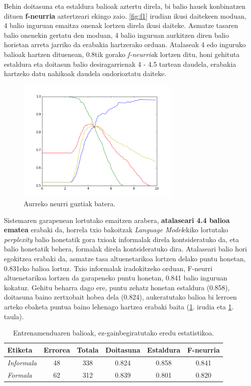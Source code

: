 \documentclass[information,article,submit,moreauthors,pdftex,10pt,a4paper]{Definitions/mdpi}
\begin{document}
Behin doitasuna eta estaldura balioak aztertu direla, bi balio hauek konbinatzen dituen \textbf{f-neurria} aztertzeari ekingo zaio. \ref{fig:f1} irudian ikusi daitekeen moduan, 4 balio inguruan emaitza onenak lortzen direla ikusi daiteke. Asmatze tasaren balio onenekin gertatu den moduan, 4 balio inguruan aurkitzen diren balio horietan arreta jarriko da erabakia hartzerako orduan. Atalaseak 4 edo inguruko balioak hartzen dituenean, 0.8tik gorako \textit{f-neurria}k lortzen ditu, honi gehituta estaldura eta doitasun balio desiragarrienak 4 - 4.5 tartean daudela, erabakia hartzeko datu nahikoak daudela ondorioztatu daiteke.

\begin{figure}[H]
  \centering
  \includegraphics[height=6cm]{denaperp}
  \caption{Aurreko neurri guztiak batera.}
  \label{fig:all m}
\end{figure}

\indent Sistemaren garapenean lortutako emaitzen arabera, \textbf{atalaseari 4.4 balioa ematea} erabaki da, horrela txio bakoitzak \textit{Language Model}ekiko lortutako \textit{perplexity} balio honetatik gora txioak informalak direla kontsideratuko da, eta balio honetatik behera, formalak direla kontsideratuko dira. Atalaseari balio hori egokitzea erabaki da, asmatze tasa altuenetarikoa lortzen delako puntu honetan, 0.831eko balioa lortuz. Txio informalak iradokitzeko orduan, F-neurri altuenetarikoa lortzen da garapeneko puntu honetan, 0.841 balio inguruan kokatuz. Gehitu beharra dago ere, puntu zehatz honetan estaldura (0.858), doitasuna baino zertxobait hobea dela (0.824), aukeratutako balioa bi lerroen arteko ebaketa puntua baino lehenago hartzea erabaki baita (\ref{fig:all m}. irudia eta \ref{tab:ez-gain train}. taula).

\begin{table}[H]
  \centering
  \begin{tabular}{|l|c|c|c|c|c|}
    \hline
    \textbf{Etiketa} &  \textbf{Errorea} & \textbf{Totala} & \textbf{Doitasuna} & \textbf{Estaldura} & \textbf{F-neurria}\\ \hline
    \textit{Informala} & 48 & 338 & 0.824  & 0.858  & 0.841\\ \hline
    \textit{Formala} & 62 & 312 & 0.839 & 0.801 & 0.820\\ \hline
  \end{tabular}
  \caption{Entrenamenduaren balioak, ez-gainbegiratutako eredu estatistikoa.}
  \label{tab:ez-gain train}
\end{table}
\end{document}
